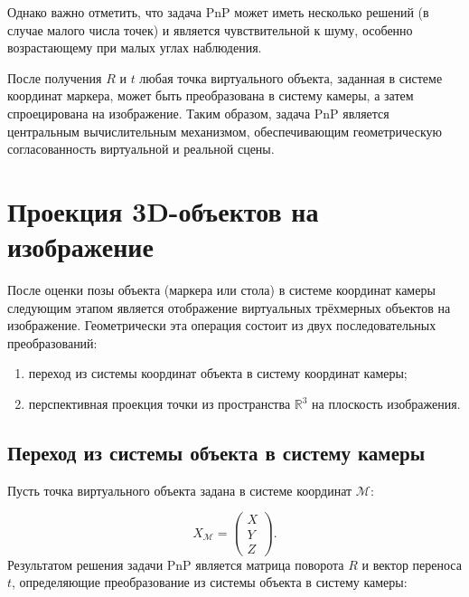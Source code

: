 \documentclass[a4paper,12pt]{article}
\begin{document}
\bigskip

Однако важно отметить, что задача PnP может иметь несколько решений (в случае малого числа точек) и является чувствительной к шуму, особенно возрастающему при малых углах наблюдения.

\bigskip

После получения $R$ и $t$ любая точка виртуального объекта, заданная в системе координат маркера, может быть преобразована в систему камеры, а затем спроецирована на изображение.
Таким образом, задача PnP является центральным вычислительным механизмом, обеспечивающим геометрическую согласованность виртуальной и реальной сцены.













\section*{Проекция 3D-объектов на изображение}

После оценки позы объекта (маркера или стола) в системе координат камеры следующим этапом является отображение виртуальных трёхмерных объектов на изображение. Геометрически эта операция состоит из двух последовательных преобразований:

\begin{enumerate}
    \item переход из системы координат объекта в систему координат камеры;
    \item перспективная проекция точки из пространства $\mathbb{R}^3$ на плоскость изображения.
\end{enumerate}

\subsection*{Переход из системы объекта в систему камеры}

Пусть точка виртуального объекта задана в системе координат $\mathcal{M}$:

\[
X_{\mathcal{M}} =
\begin{pmatrix}
X \\
Y \\
Z
\end{pmatrix}.
\]
Результатом решения задачи PnP является матрица поворота $R$ и вектор переноса $t$, определяющие преобразование из системы объекта в систему камеры:
\end{document}
